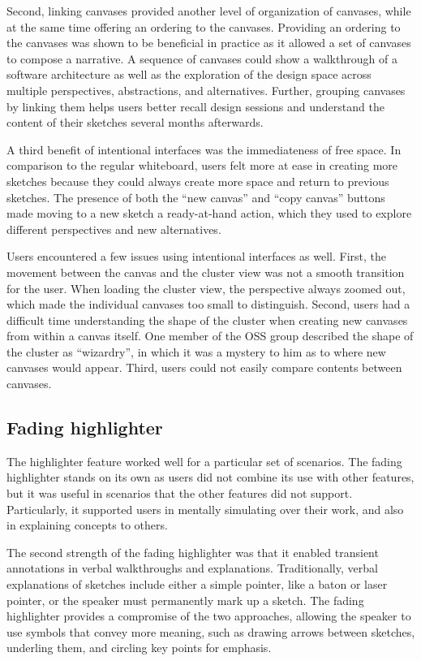 \documentclass[12pt,fleqn]{ucithesis}
\begin{document}
Second, linking canvases provided another level of organization of canvases, while at the same time offering an ordering to the canvases. Providing an ordering to the canvases was shown to be beneficial in practice as it allowed a set of canvases to compose a narrative. A sequence of canvases could show a walkthrough of a software architecture as well as the exploration of the design space across multiple perspectives, abstractions, and alternatives. Further, grouping canvases by linking them helps users better recall design sessions and understand the content of their sketches several months afterwards.

A third benefit of intentional interfaces was the immediateness of free space. In comparison to the regular whiteboard, users felt more at ease in creating more sketches because they could always create more space and return to previous sketches. The presence of both the ``new canvas'' and ``copy canvas'' buttons made moving to a new sketch a ready-at-hand action, which they used to explore different perspectives and new alternatives.

Users encountered a few issues using intentional interfaces as well. First, the movement between the canvas and the cluster view was not a smooth transition for the user. When loading the cluster view, the perspective always zoomed out, which made the individual canvases too small to distinguish. Second, users had a difficult time understanding the shape of the cluster when creating new canvases from within a canvas itself. One member of the OSS group described the shape of the cluster as ``wizardry'', in which it was a mystery to him as to where new canvases would appear. Third, users could not easily compare contents between canvases.

\subsection{Fading highlighter}

	
The highlighter feature worked well for a particular set of scenarios. The fading highlighter stands on its own as users did not combine its use with other features, but it was useful in scenarios that the other features did not support. Particularly, it supported users in mentally simulating over their work, and also in explaining concepts to others. 

The second strength of the fading highlighter was that it enabled transient annotations in verbal walkthroughs and explanations. Traditionally, verbal explanations of sketches include either a simple pointer, like a baton or laser pointer, or the speaker must permanently mark up a sketch. The fading highlighter provides a compromise of the two approaches, allowing the speaker to use symbols that convey more meaning, such as drawing arrows between sketches, underling them, and circling key points for emphasis.
\end{document}
